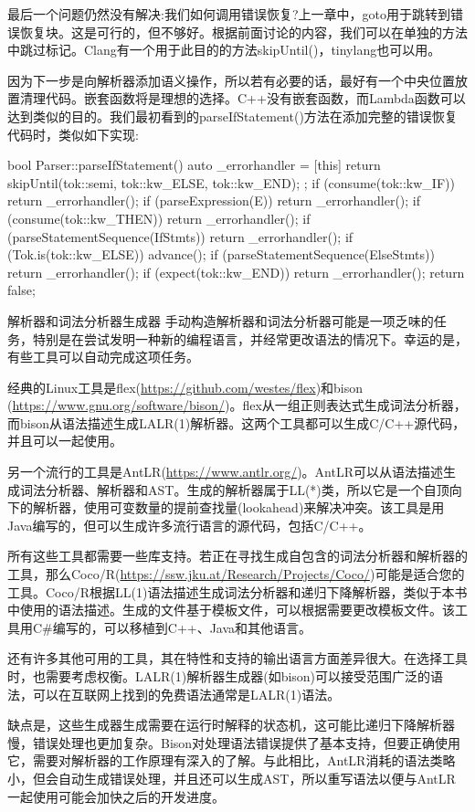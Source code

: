 最后一个问题仍然没有解决:我们如何调用错误恢复?上一章中，goto用于跳转到错误恢复块。这是可行的，但不够好。根据前面讨论的内容，我们可以在单独的方法中跳过标记。Clang有一个用于此目的的方法skipUntil()，tinylang也可以用。

因为下一步是向解析器添加语义操作，所以若有必要的话，最好有一个中央位置放置清理代码。嵌套函数将是理想的选择。C++没有嵌套函数，而Lambda函数可以达到类似的目的。我们最初看到的parseIfStatement()方法在添加完整的错误恢复代码时，类似如下实现:

\begin{cpp}
bool Parser::parseIfStatement() {
    auto _errorhandler = [this] {
        return skipUntil(tok::semi, tok::kw_ELSE, tok::kw_END);
    };
    if (consume(tok::kw_IF))
        return _errorhandler();
    if (parseExpression(E))
        return _errorhandler();
    if (consume(tok::kw_THEN))
        return _errorhandler();
    if (parseStatementSequence(IfStmts))
        return _errorhandler();
    if (Tok.is(tok::kw_ELSE)) {
        advance();
        if (parseStatementSequence(ElseStmts))
        return _errorhandler();
    }
    if (expect(tok::kw_END))
        return _errorhandler();
    return false;
}
\end{cpp}

\begin{myTip}{解析器和词法分析器生成器}
手动构造解析器和词法分析器可能是一项乏味的任务，特别是在尝试发明一种新的编程语言，并经常更改语法的情况下。幸运的是，有些工具可以自动完成这项任务。

经典的Linux工具是flex(\url{https://github.com/westes/flex})和bison (\url{https://www.gnu.org/software/bison/})。flex从一组正则表达式生成词法分析器，而bison从语法描述生成LALR(1)解析器。这两个工具都可以生成C/C++源代码，并且可以一起使用。

另一个流行的工具是AntLR(\url{https://www.antlr.org/})。AntLR可以从语法描述生成词法分析器、解析器和AST。生成的解析器属于LL(*)类，所以它是一个自顶向下的解析器，使用可变数量的提前查找量(lookahead)来解决冲突。该工具是用Java编写的，但可以生成许多流行语言的源代码，包括C/C++。

所有这些工具都需要一些库支持。若正在寻找生成自包含的词法分析器和解析器的工具，那么Coco/R(\url{https://ssw.jku.at/Research/Projects/Coco/})可能是适合您的工具。Coco/R根据LL(1)语法描述生成词法分析器和递归下降解析器，类似于本书中使用的语法描述。生成的文件基于模板文件，可以根据需要更改模板文件。该工具用C\#编写的，可以移植到C++、Java和其他语言。

还有许多其他可用的工具，其在特性和支持的输出语言方面差异很大。在选择工具时，也需要考虑权衡。LALR(1)解析器生成器(如bison)可以接受范围广泛的语法，可以在互联网上找到的免费语法通常是LALR(1)语法。

缺点是，这些生成器生成需要在运行时解释的状态机，这可能比递归下降解析器慢，错误处理也更加复杂。Bison对处理语法错误提供了基本支持，但要正确使用它，需要对解析器的工作原理有深入的了解。与此相比，AntLR消耗的语法类略小，但会自动生成错误处理，并且还可以生成AST，所以重写语法以便与AntLR一起使用可能会加快之后的开发进度。
\end{myTip}
